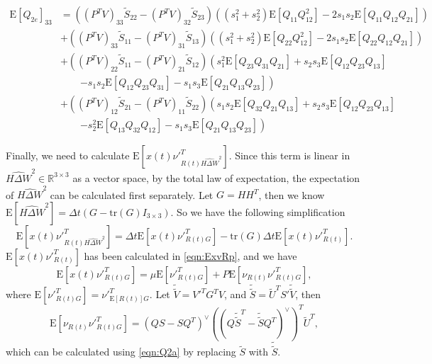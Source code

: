 \documentclass[10pt]{article}
\newcommand{\tr}[1]{\ensuremath{\mathrm{tr}\left( #1 \right)}}
\newcommand{\expect}[1]{\ensuremath{\mathrm{E}\left[ #1 \right]}}
\newcommand{\real}[1]{\ensuremath{\mathbb{R}^{ #1 }}}
\begin{document}
\begin{align}
	\expect{Q_{2e}}_{33} &= \left( (P^TV)_{33}\tilde{S}_{22} - (P^TV)_{32}\tilde{S}_{23} \right)\left( (s_1^2+s_2^2)\expect{Q_{11}Q_{12}^2} - 2s_1s_2\expect{Q_{11}Q_{12}Q_{21}} \right) \nonumber \\
	&+ \left( (P^TV)_{33}\tilde{S}_{11} - (P^TV)_{31}\tilde{S}_{13} \right)\left( (s_1^2+s_2^2)\expect{Q_{22}Q_{12}^2} - 2s_1s_2\expect{Q_{22}Q_{12}Q_{21}} \right) \nonumber \\
	&+ \left( (P^TV)_{22}\tilde{S}_{11} - (P^TV)_{21}\tilde{S}_{12} \right)\left( s_1^2\expect{Q_{23}Q_{31}Q_{21}} + s_2s_3\expect{Q_{12}Q_{23}Q_{13}} \right. \nonumber \\ &\qquad \left. - s_1s_2\expect{Q_{12}Q_{23}Q_{31}} - s_1s_3\expect{Q_{21}Q_{13}Q_{23}} \right) \nonumber \\
	&+ \left( (P^TV)_{12}\tilde{S}_{21} - (P^TV)_{11}\tilde{S}_{22} \right)\left( s_1s_2\expect{Q_{32}Q_{21}Q_{13}} + s_2s_3\expect{Q_{12}Q_{23}Q_{13}} \right. \nonumber \\ &\qquad \left. - s_2^2\expect{Q_{13}Q_{32}Q_{12}} - s_1s_3\expect{Q_{21}Q_{13}Q_{23}} \right)
\end{align}

Finally, we need to calculate $\expect{x(t)\nu'^T_{R(t)\widehat{H\Delta W}^2}}$.
Since this term is linear in $\widehat{H\Delta W}^2\in\real{3\times 3}$ as a vector space, by the total law of expectation, the expectation of $\widehat{H\Delta W}^2$ can be calculated first separately.
Let $G = HH^T$, then we know $\expect{\widehat{H\Delta W}^2} = \Delta t(G-\tr{G}I_{3\times 3})$.
So we have the following simplification
\begin{equation}
	\expect{x(t)\nu'^T_{R(t)\widehat{H\Delta W}^2}} = \Delta t\expect{x(t)\nu'^T_{R(t)G}} - \tr{G}\Delta t\expect{x(t)\nu'^T_{R(t)}}.
\end{equation}
$\expect{x(t)\nu'^T_{R(t)}}$ has been calculated in \eqref{eqn:ExvRp}, and we have
\begin{equation}
	\expect{x(t)\nu'^T_{R(t)G}} = \mu\expect{\nu'^T_{R(t)G}} + P\expect{\nu_{R(t)}\nu'^T_{R(t)G}},
\end{equation}
where $\expect{\nu'^T_{R(t)G}} = \nu'^T_{\expect{R(t)}G}$.
Let $\tilde{\tilde{V}} = V'^TG^TV$, and $\tilde{\tilde{S}} = \tilde{U}^TS'\tilde{\tilde{V}}$, then
\begin{equation}
	\expect{\nu_{R(t)}\nu'^T_{R(t)G}} = (QS-SQ^T)^\vee\left( \left( Q\tilde{\tilde{S}}^T-\tilde{\tilde{S}}Q^T \right)^\vee \right)^T\tilde{U}^T,
\end{equation}
which can be calculated using \eqref{eqn:Q2a} by replacing $\tilde{S}$ with $\tilde{\tilde{S}}$.
\end{document}
